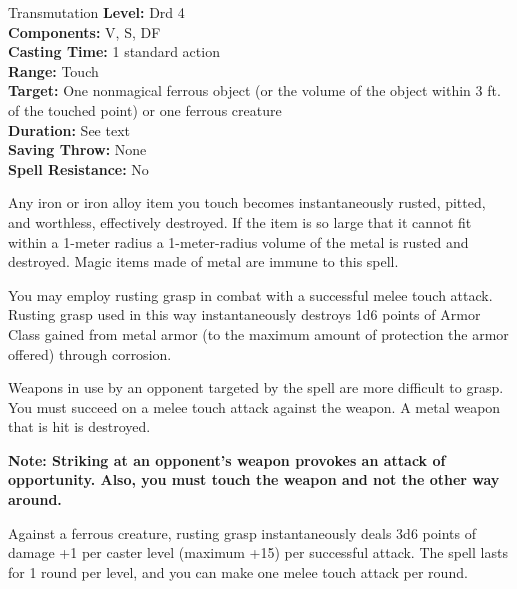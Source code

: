 {Transmutation}
{
	\textbf{Level:}
	Drd 4\\
	\textbf{Components:}
	V, S, DF\\
	\textbf{Casting Time:}
	1 standard action\\
	\textbf{Range:}
	Touch\\
	\textbf{Target:}
	One nonmagical ferrous object (or the volume of the object within 3 ft. of the touched point) or one ferrous creature\\
	\textbf{Duration:}
	See text\\
	\textbf{Saving Throw:}
	None\\
	\textbf{Spell Resistance:}
	No\\
}
{
	Any iron or iron alloy item you touch becomes instantaneously rusted, pitted, and worthless, effectively destroyed. If the item is so large that it cannot fit within a 1-meter radius a 1-meter-radius volume of the metal is rusted and destroyed. Magic items made of metal are immune to this spell.

	You may employ rusting grasp in combat with a successful melee touch attack. Rusting grasp used in this way instantaneously destroys 1d6 points of Armor Class gained from metal armor (to the maximum amount of protection the armor offered) through corrosion.

	Weapons in use by an opponent targeted by the spell are more difficult to grasp. You must succeed on a melee touch attack against the weapon. A metal weapon that is hit is destroyed.

	\textbf{Note: Striking at an opponent's weapon provokes an attack of opportunity. Also, you must touch the weapon and not the other way around.}

	Against a ferrous creature, rusting grasp instantaneously deals 3d6 points of damage +1 per caster level (maximum +15) per successful attack. The spell lasts for 1 round per level, and you can make one melee touch attack per round.

}
